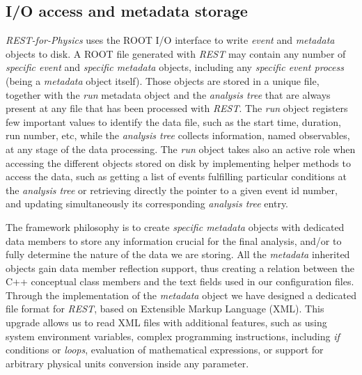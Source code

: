 



\subsection{I/O access and metadata storage}



\emph{REST-for-Physics} uses the ROOT I/O interface to write \emph{event} and \emph{metadata} objects to disk. A ROOT file generated with \emph{REST} may contain any number of \emph{specific event} and \emph{specific metadata} objects, including any \emph{specific event process} (being a \emph{metadata} object itself). Those objects are stored in a unique file, together with the \emph{run} metadata object and the \emph{analysis tree} that are always present at any file that has been processed with \emph{REST}. The \emph{run} object registers few important values to identify the data file, such as the start time, duration, run number, etc, while the \emph{analysis tree} collects information, named observables, at any stage of the data processing. The \emph{run} object takes also an active role when accessing the different objects stored on disk by implementing helper methods to access the data, such as getting a list of events fulfilling particular conditions at the \emph{analysis tree} or retrieving directly the pointer to a given event id number, and updating simultaneously its corresponding \emph{analysis tree} entry.

The framework philosophy is to create \emph{specific metadata} objects with dedicated data members to store any information crucial for the final analysis, and/or to fully determine the nature of the data we are storing. All the \emph{metadata} inherited objects gain data member reflection support, thus creating a relation between the C++ conceptual class members and the text fields used in our configuration files. Through the implementation of the \emph{metadata} object we have designed a dedicated file format for \emph{REST}, based on Extensible Markup Language (XML). This upgrade allows us to read XML files with additional features, such as using system environment variables, complex programming instructions, including \emph{if} conditions or \emph{loops}, evaluation of mathematical expressions, or support for arbitrary physical units conversion inside any parameter.

